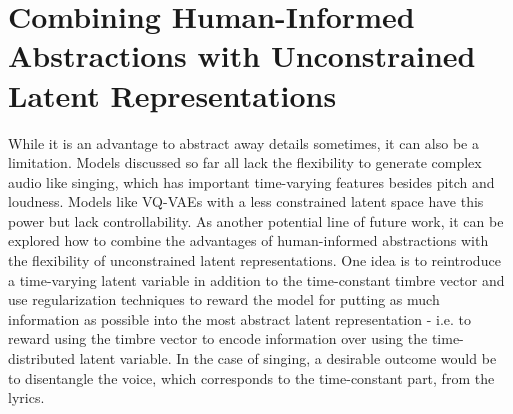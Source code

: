 \section{Combining Human-Informed Abstractions with Unconstrained Latent Representations}
\label{sec:again-time-distributed}
While it is an advantage to abstract away details sometimes, it can also be a limitation. Models discussed so far all lack the flexibility to generate complex audio like singing, which has important time-varying features besides pitch and loudness. Models like VQ-VAEs with a less constrained latent space have this power but lack controllability. \newline
As another potential line of future work, it can be explored how to combine the advantages of human-informed abstractions with the flexibility of unconstrained latent representations. One idea is to reintroduce a time-varying latent variable in addition to the time-constant timbre vector and use regularization techniques to reward the model for putting as much information as possible into the most abstract latent representation - i.e. to reward using the timbre vector to encode information over using the time-distributed latent variable. In the case of singing, a desirable outcome would be to disentangle the voice, which corresponds to the time-constant part, from the lyrics.

